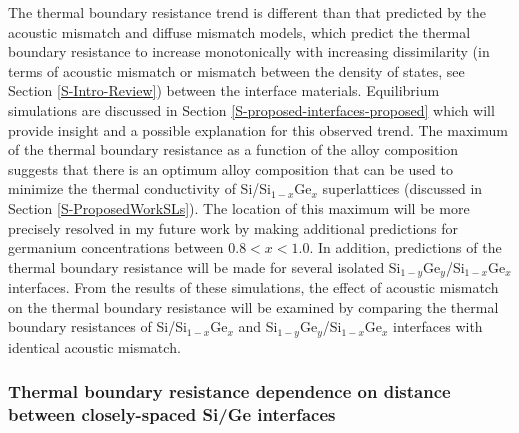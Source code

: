 \documentclass[letterpaper,12pt]{article}
\begin{document}
The thermal boundary resistance trend is different than that
predicted by the acoustic mismatch and diffuse mismatch models,
which predict the thermal boundary resistance to increase
monotonically with increasing dissimilarity (in terms of acoustic
mismatch or mismatch between the density of states, see Section
\ref{S-Intro-Review}) between the interface materials. Equilibrium
simulations are discussed in Section
\ref{S-proposed-interfaces-proposed} which will provide insight and
a possible explanation for this observed trend. The maximum of the
thermal boundary resistance as a function of the alloy composition
suggests that there is an optimum alloy composition that can be used
to minimize the thermal conductivity of Si/Si$_{1-x}$Ge$_x$
superlattices (discussed in Section \ref{S-ProposedWorkSLs}). The
location of this maximum will be more precisely resolved in my
future work by making additional predictions for germanium
concentrations between $0.8 < x < 1.0$. In addition, predictions of
the thermal boundary resistance will be made for several isolated
Si$_{1-y}$Ge$_y$/Si$_{1-x}$Ge$_x$ interfaces. From the results of
these simulations, the effect of acoustic mismatch on the thermal
boundary resistance will be examined by comparing the thermal
boundary resistances of Si/Si$_{1-x}$Ge$_x$ and
Si$_{1-y}$Ge$_y$/Si$_{1-x}$Ge$_x$ interfaces with identical acoustic
mismatch.

\subsubsection*{Thermal boundary resistance dependence on distance
between closely-spaced Si/Ge interfaces}

\end{document}
